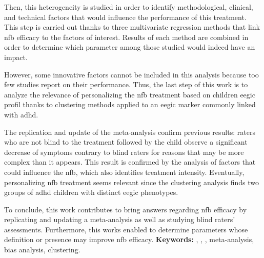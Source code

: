 Then, this heterogeneity is studied in order to identify methodological, clinical, and technical factors that would influence
the performance of this treatment. This step is carried out thanks to three multivariate regression methods that link \gls{nfb} 
efficacy to the factors of interest. Results of each method are combined in order to determine which parameter among those
studied would indeed have an impact. 

However, some innovative factors cannot be included in this analysis because too few studies report on their performance.
Thus, the last step of this work is to analyze the relevance of personalizing the \gls{nfb} treatment based on children \gls{eegic} profil
thanks to clustering methods applied to an \gls{eegic} marker commonly linked with \gls{adhd}.

The replication and update of the meta-analysis confirm previous results: raters who are not blind to the treatment
followed by the child observe a significant decrease of symptoms contrary to blind raters for reasons that may be more complex 
than it appears. This result is confirmed by the analysis of factors that could influence the \gls{nfb}, which also identifies 
treatment intensity. Eventually, personalizing \gls{nfb} treatment seems relevant since the clustering analysis finds two groups
of \gls{adhd} children with distinct \gls{eegic} phenotypes. 

To conclude, this work contributes to bring answers regarding \gls{nfb} efficacy by replicating and updating a meta-analysis as well 
as studying blind raters' assessments. Furthermore, this works enabled to determine parameters whose definition or presence may improve
\gls{nfb} efficacy.
\vskip 0.3in
\noindent \large{\textbf{Keywords:}} , , , meta-analysis, bias analysis, clustering.